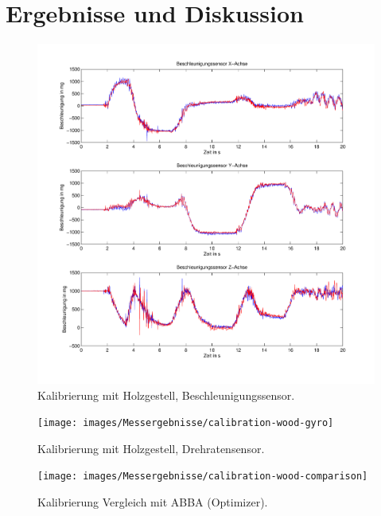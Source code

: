 
\lhead[\chaptername~\thechapter]{\rightmark}


\rhead[\leftmark]{}


\lfoot[\thepage]{}


\cfoot{}


\rfoot[]{\thepage}


\chapter{Ergebnisse und Diskussion}

\begin{figure}
	\centering
	\includegraphics[width=1\textwidth]{images/Messergebnisse/calibration-wood-accel}
	\caption{Kalibrierung mit Holzgestell, Beschleunigungssensor.}
\end{figure}

\begin{figure}
	\centering
	\texttt{[image: images/Messergebnisse/calibration-wood-gyro]}
	\caption{Kalibrierung mit Holzgestell, Drehratensensor.}
\end{figure}

\begin{figure}
	\centering
	\texttt{[image: images/Messergebnisse/calibration-wood-comparison]}
	\caption{Kalibrierung Vergleich mit ABBA (Optimizer).}
\end{figure}

